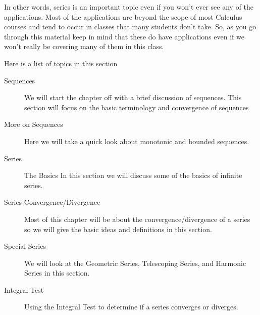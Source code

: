 \documentclass{article}
\begin{document}

	
In other words, series is an important topic even if you won’t ever see any of the applications.  Most of the applications are beyond the scope of most Calculus courses and tend to occur in classes that many students don’t take.  So, as you go through this material keep in mind that these do have applications even if we won’t really be covering many of them in this class.
 


	
Here is a list of topics in this section
 
\begin{description}
	\item[Sequences ] We will start the chapter off with a brief discussion of sequences.  This section will focus on the basic terminology and convergence of sequences
 
\item[More on Sequences]  Here we will take a quick look about monotonic and bounded sequences.
 
\item[Series]  The Basics  In this section we will discuss some of the basics of infinite series.
\end{description}


	
	\begin{description}
		\item[Series Convergence/Divergence]  Most of this chapter will be about the convergence/divergence of a series so we will give the basic ideas and definitions in this section.
 
\item[Special Series]  We will look at the Geometric Series, Telescoping Series, and Harmonic Series in this section.
 
\item[Integral Test]  Using the Integral Test to determine if a series converges or diverges.
\end{description}

\end{document}

